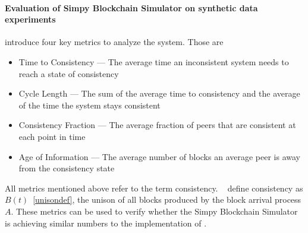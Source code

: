 \paragraph{Evaluation of Simpy Blockchain Simulator on synthetic data experiments}
\citeauthor{gopalan} introduce four key metrics to analyze the system. Those are 
\begin{itemize}
\item Time to Consistency --- The average time an inconsistent system needs to reach a state of consistency
\item Cycle Length --- The sum of the average time to consistency and the average of the time the system stays consistent
\item Consistency Fraction --- The average fraction of peers that are consistent at each point in time
\item Age of Information --- The average number of blocks an average peer is away from the consistency state
\end{itemize}
All metrics mentioned above refer to the term consistency. \gopalan~ define consistency as $B(t)$~\ref{unisondef}, the unison of all blocks produced by the block arrival process $A$.
These metrics can be used to verify whether the Simpy Blockchain Simulator is achieving similar numbers to the implementation of \gopalan . 

